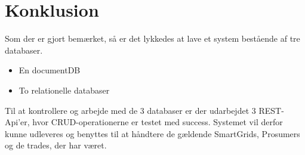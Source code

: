 
\section{Konklusion}

Som der er gjort bemærket, så er det lykkedes at lave et system bestående af tre databaser.

\begin{itemize}
    \item En documentDB
    \item To relationelle databaser 
\end{itemize}

Til at kontrollere og arbejde med de 3 databaser er der udarbejdet 3 REST-Api'er, hvor CRUD-operationerne er testet med success.
Systemet vil derfor kunne udleveres og benyttes til at håndtere de gældende SmartGrids, Prosumers og de trades, der har været.
